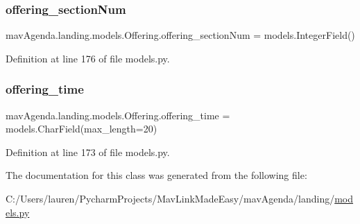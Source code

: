 \subsubsection{\texorpdfstring{offering\+\_\+section\+Num}{offering\_sectionNum}}
{\footnotesize\ttfamily mav\+Agenda.\+landing.\+models.\+Offering.\+offering\+\_\+section\+Num = models.\+Integer\+Field()\hspace{0.3cm}{\ttfamily [static]}}



Definition at line 176 of file models.\+py.

\mbox{\label{classmavAgenda_1_1landing_1_1models_1_1Offering_ab39dc674156698916244ba97ad8c3ba1}} 
\subsubsection{\texorpdfstring{offering\+\_\+time}{offering\_time}}
{\footnotesize\ttfamily mav\+Agenda.\+landing.\+models.\+Offering.\+offering\+\_\+time = models.\+Char\+Field(max\+\_\+length=20)\hspace{0.3cm}{\ttfamily [static]}}



Definition at line 173 of file models.\+py.



The documentation for this class was generated from the following file\+:\begin{DoxyCompactItemize}
\item 
C\+:/\+Users/lauren/\+Pycharm\+Projects/\+Mav\+Link\+Made\+Easy/mav\+Agenda/landing/\mbox{\hyperlink{models_8py}{models.\+py}}\end{DoxyCompactItemize}
